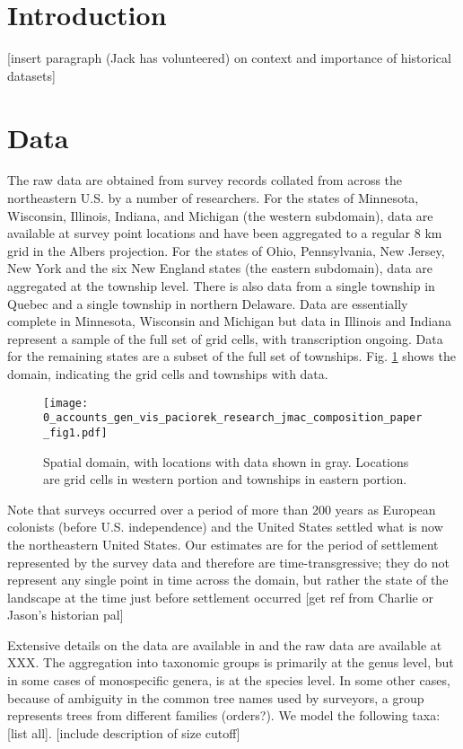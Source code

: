 \documentclass[12pt]{article}\usepackage[]{graphicx}\usepackage[]{color}
\begin{document}
\section{Introduction}

{[}insert paragraph (Jack has volunteered) on context and importance
of historical datasets{]}


\section{Data}

The raw data are obtained from survey records collated from across
the northeastern U.S. by a number of researchers. For the states of
Minnesota, Wisconsin, Illinois, Indiana, and Michigan (the western
subdomain), data are available at survey point locations and have
been aggregated to a regular 8 km grid in the Albers projection. For
the states of Ohio, Pennsylvania, New Jersey, New York and the six
New England states (the eastern subdomain), data are aggregated at
the township level. There is also data from a single township in Quebec
and a single township in northern Delaware. Data are essentially complete
in Minnesota, Wisconsin and Michigan but data in Illinois and Indiana
represent a sample of the full set of grid cells, with transcription
ongoing. Data for the remaining states are a subset of the full set
of townships. Fig. \ref{fig:domain} shows the domain, indicating
the grid cells and townships with data.

\begin{figure}
\label{fig:domain}

\texttt{[image: 0\_accounts\_gen\_vis\_paciorek\_research\_jmac\_composition\_paper\_fig1.pdf]}

\caption{Spatial domain, with locations with data shown in gray. Locations
are grid cells in western portion and townships in eastern portion.}
\end{figure}


Note that surveys occurred over a period of more than 200 years as
European colonists (before U.S. independence) and the United States
settled what is now the northeastern United States. Our estimates
are for the period of settlement represented by the survey data and
therefore are time-transgressive; they do not represent any single
point in time across the domain, but rather the state of the landscape
at the time just before settlement occurred {[}get ref from Charlie
or Jason's historian pal{]}

Extensive details on the data are available in \cite{Gori:etal:2015}
and the raw data are available at XXX. The aggregation into taxonomic
groups is primarily at the genus level, but in some cases of monospecific
genera, is at the species level. In some other cases, because of ambiguity
in the common tree names used by surveyors, a group represents trees
from different families (orders?). We model the following taxa: {[}list
all{]}. {[}include description of size cutoff{]}
\end{document}
